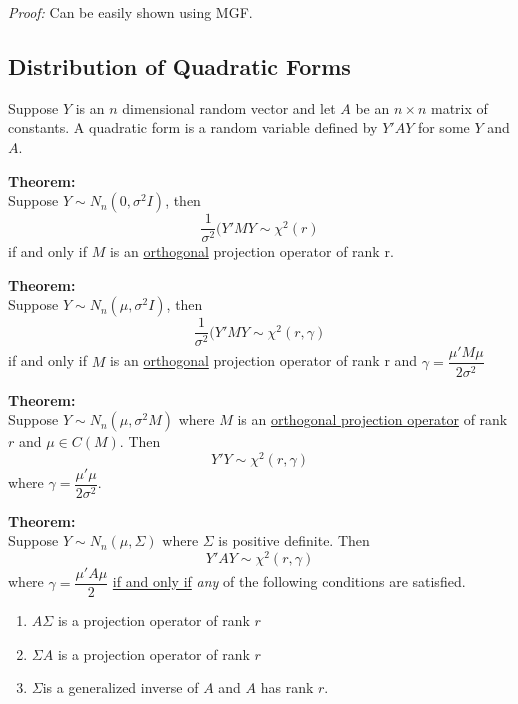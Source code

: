 \documentclass[12pt]{article}
\numberwithin{equation}{section}
\begin{document}
\textit{Proof:}
Can be easily shown using MGF.


\subsection{Distribution of Quadratic Forms}
Suppose $Y$ is an $n$ dimensional random vector and let $A$ be an $n \times n$ matrix of constants. A quadratic form is a random variable defined by $Y'AY$ for some $Y$ and $A$.

\textbf{Theorem:} \\
Suppose $Y \sim N_n(0, \sigma^2I)$, then
\begin{equation*}
  \frac{1}{\sigma^2}(Y'MY \sim \chi^2(r)
\end{equation*}
if and only if $M$ is an \underline{orthogonal} projection operator of rank r.

\textbf{Theorem:} \\
Suppose $Y \sim N_n(\mu, \sigma^2I)$, then
\begin{equation*}
  \frac{1}{\sigma^2}(Y'MY \sim \chi^2(r, \gamma)
\end{equation*}
if and only if $M$ is an \underline{orthogonal} projection operator of rank r and $\gamma = \dfrac{\mu'M\mu}{2\sigma^2}$

\textbf{Theorem:} \\
Suppose $Y \sim N_n(\mu, \sigma^2M)$ where $M$ is an \underline{orthogonal projection operator} of rank $r$ and $\mu \in C(M)$. Then
\begin{equation*}
  Y'Y \sim \chi^2(r, \gamma)
\end{equation*}
where $\gamma = \dfrac{\mu'\mu}{2 \sigma^2}$.

\textbf{Theorem:} \\
Suppose $Y \sim N_n(\mu, \Sigma)$ where $\Sigma$ is positive definite. Then
\begin{equation*}
  Y'AY \sim \chi^2(r, \gamma)
\end{equation*}
where $\gamma = \dfrac{\mu'A\mu}{2}$ \underline{if and only if} \textit{any} of the following conditions are satisfied.
%
\begin{enumerate}
  \item $A\Sigma$ is a projection operator of rank $r$
  \item $\Sigma A$ is a projection operator of rank $r$
  \item $\Sigma $is a generalized inverse of $A$ and $A$ has rank $r$.
\end{enumerate}
\end{document}
